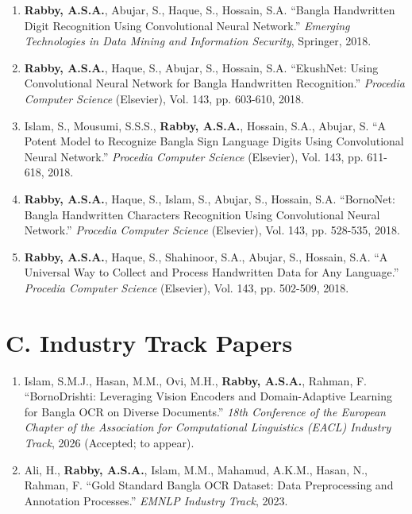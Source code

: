 \documentclass[11pt]{article}
\begin{document}
\begin{enumerate}
    \item \textbf{Rabby, A.S.A.}, Abujar, S., Haque, S., Hossain, S.A. ``Bangla Handwritten Digit Recognition Using Convolutional Neural Network.'' \textit{Emerging Technologies in Data Mining and Information Security}, Springer, 2018.
    
    \item \textbf{Rabby, A.S.A.}, Haque, S., Abujar, S., Hossain, S.A. ``EkushNet: Using Convolutional Neural Network for Bangla Handwritten Recognition.'' \textit{Procedia Computer Science} (Elsevier), Vol. 143, pp. 603-610, 2018.

    \item Islam, S., Mousumi, S.S.S., \textbf{Rabby, A.S.A.}, Hossain, S.A., Abujar, S. ``A Potent Model to Recognize Bangla Sign Language Digits Using Convolutional Neural Network.'' \textit{Procedia Computer Science} (Elsevier), Vol. 143, pp. 611-618, 2018.

    \item \textbf{Rabby, A.S.A.}, Haque, S., Islam, S., Abujar, S., Hossain, S.A. ``BornoNet: Bangla Handwritten Characters Recognition Using Convolutional Neural Network.'' \textit{Procedia Computer Science} (Elsevier), Vol. 143, pp. 528-535, 2018.
    
    \item \textbf{Rabby, A.S.A.}, Haque, S., Shahinoor, S.A., Abujar, S., Hossain, S.A. ``A Universal Way to Collect and Process Handwritten Data for Any Language.'' \textit{Procedia Computer Science} (Elsevier), Vol. 143, pp. 502-509, 2018.
\end{enumerate}

\section*{C. Industry Track Papers}
\renewcommand{\theenumi}{IT\arabic{enumi}}
\begin{enumerate}
    \item Islam, S.M.J., Hasan, M.M., Ovi, M.H., \textbf{Rabby, A.S.A.}, Rahman, F. ``BornoDrishti: Leveraging Vision Encoders and Domain-Adaptive Learning for Bangla OCR on Diverse Documents.'' \textit{18th Conference of the European Chapter of the Association for Computational Linguistics (EACL) Industry Track}, 2026 (Accepted; to appear).

    \item Ali, H., \textbf{Rabby, A.S.A.}, Islam, M.M., Mahamud, A.K.M., Hasan, N., Rahman, F. ``Gold Standard Bangla OCR Dataset: Data Preprocessing and Annotation Processes.'' \textit{EMNLP Industry Track}, 2023.
\end{enumerate}
\end{document}
